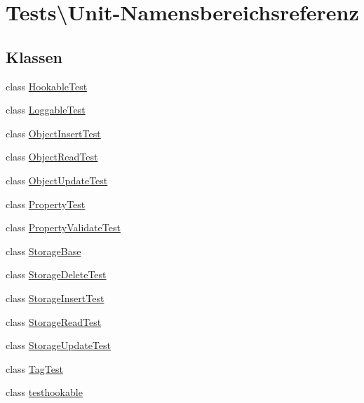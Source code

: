 \hypertarget{namespaceTests_1_1Unit}{}\section{Tests\textbackslash{}Unit-\/\+Namensbereichsreferenz}
\label{namespaceTests_1_1Unit}
\subsection*{Klassen}
\begin{DoxyCompactItemize}
\item 
class \hyperlink{classTests_1_1Unit_1_1HookableTest}{Hookable\+Test}
\item 
class \hyperlink{classTests_1_1Unit_1_1LoggableTest}{Loggable\+Test}
\item 
class \hyperlink{classTests_1_1Unit_1_1ObjectInsertTest}{Object\+Insert\+Test}
\item 
class \hyperlink{classTests_1_1Unit_1_1ObjectReadTest}{Object\+Read\+Test}
\item 
class \hyperlink{classTests_1_1Unit_1_1ObjectUpdateTest}{Object\+Update\+Test}
\item 
class \hyperlink{classTests_1_1Unit_1_1PropertyTest}{Property\+Test}
\item 
class \hyperlink{classTests_1_1Unit_1_1PropertyValidateTest}{Property\+Validate\+Test}
\item 
class \hyperlink{classTests_1_1Unit_1_1StorageBase}{Storage\+Base}
\item 
class \hyperlink{classTests_1_1Unit_1_1StorageDeleteTest}{Storage\+Delete\+Test}
\item 
class \hyperlink{classTests_1_1Unit_1_1StorageInsertTest}{Storage\+Insert\+Test}
\item 
class \hyperlink{classTests_1_1Unit_1_1StorageReadTest}{Storage\+Read\+Test}
\item 
class \hyperlink{classTests_1_1Unit_1_1StorageUpdateTest}{Storage\+Update\+Test}
\item 
class \hyperlink{classTests_1_1Unit_1_1TagTest}{Tag\+Test}
\item 
class \hyperlink{classTests_1_1Unit_1_1testhookable}{testhookable}
\end{DoxyCompactItemize}
